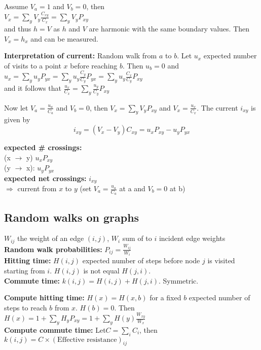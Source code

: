 Assume $V_a = 1$ and $V_b = 0$, then\\
$V_x = \sum_y V_y \frac{C_{xy}}{C_x} = \sum_y V_y P_{xy}$\\
and thus $h = V$ as $h$ and $V$ are harmonic with the same boundary values. Then $V_x = h_x$ and can be measured.

\textbf{Interpretation of current:} Random walk from $a$ to $b$. Let $u_x$ expected number of visits to a point $x$ before reaching $b$. Then $u_b = 0$ and\\
$u_x = \sum_y u_y P_{yx} = \sum_y u_y \frac{C_y}{C_y} P_{yx} = \sum_y u_y \frac{C_x}{C_y} P_{xy}$\\
and it follows that
$\frac{u_x}{C_x} = \sum_y \frac{u_y}{C_y} P_{xy}$

Now let $V_a = \frac{u_a}{C_a}$ and $V_b = 0$, then $V_x = \sum_y V_y P_{xy}$ and $V_x = \frac{u_x}{C_x}$. The current $i_{xy}$ is given by
$$
i_{xy} = (V_x - V_y) C_{xy} = u_x P_{xy} - u_y P_{yx}
$$

\textbf{expected \# crossings:}\\
(x $\rightarrow$ y) $u_x P_{xy}$\\
(y $\rightarrow$ x): $u_y P_{yx}$\\
\textbf{expected net crossings:} $i_{xy}$\\
$\Rightarrow$ current from $x$ to $y$ (set $V_a = \frac{u_a}{C_a}$ at a and $V_b = 0$ at b)

\subsection*{Random walks on graphs}
$W_{ij}$ the weight of an edge $(i,j)$, $W_i$ sum of to $i$ incident edge weights\\
\textbf{Random walk probabilities:} $P_{ij} = \frac{W_{ij}}{W_i}$\\
\textbf{Hitting time:} $H(i,j)$ expected number of steps before node $j$ is visited starting from $i$. $H(i,j)$ is not equal $H(j,i)$.\\
\textbf{Commute time:} $k(i,j) = H(i,j) + H(j,i)$. Symmetric.

\textbf{Compute hitting time:} $H(x) = H(x,b)$ for a fixed $b$ expected number of steps to reach $b$ from $x$. $H(b) = 0$. Then\\
$H(x) = 1 + \sum_y H_y P_{xy} = 1 + \sum_y H(y) \frac{W_{xy}}{W_x}$\\
\textbf{Compute commute time:} Let$C = \sum_i C_i$, then\\
$k(i,j) = C \times (\text{Effective resistance})_{ij}$

